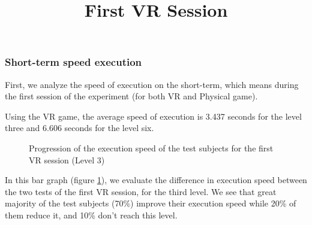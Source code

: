 \documentclass[12pt, openany, twocolumn]{article}
\begin{document}
        \subsubsection{Short-term speed execution}
        First, we analyze the speed of execution on the short-term, which means during the first session of the experiment (for both VR and Physical game).
        \\

            \noindent \title{\textbf{First VR Session}} \vspace{0.25cm}
            
            Using the VR game, the average speed of execution is 3.437 seconds for the level three and 6.606 seconds for the level six.

                \begin{figure}[H]
                    \centering
                    \setlength{\fboxsep}{0pt}
                    \caption{Progression of the execution speed of the test subjects for the first VR session (Level 3)}
                    \label{figure19}
                \end{figure}

            In this bar graph (figure \ref{figure19}), we evaluate the difference in execution speed between the two tests of the first VR session, for the third level. 
            We see that great majority of the test subjects (70\%) improve their execution speed while 20\% of them reduce it, and 10\% don't reach this level.
            \\
\end{document}
